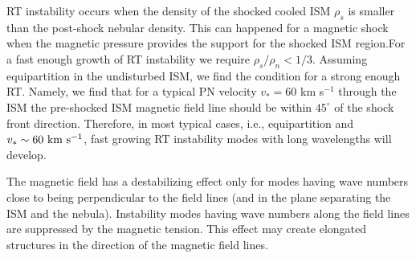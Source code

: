 \documentclass{article}
\def \s{\rm{s}}
\def \km{\rm{km}}
\def \s{~\rm{s}}
\def \km{~\rm{km}}
\begin{document}
RT instability occurs when the density of the shocked cooled ISM 
$\rho_s$ is smaller
than the post-shock nebular density. 
This can happened for a magnetic shock when the magnetic pressure
 provides the support for the shocked ISM region.For a fast enough growth of
RT instability we require $\rho_s/\rho_n < 1/3$.  
Assuming equipartition  in the 
undisturbed ISM, we find the condition for a strong enough RT.
Namely, we  find that for a typical PN velocity $v_\ast=60$  km s$^{-1}$
 through the ISM the pre-shocked ISM
magnetic field line should be within $45^\circ$ of the shock front direction.
 Therefore, in most typical cases, i.e., equipartition and
$v_\ast \sim 60 \km \s^{-1}$, fast growing RT instability modes with long
wavelengths will develop.

The magnetic field has a destabilizing effect only for modes
having wave numbers close to being perpendicular to the field lines
(and in the plane separating the ISM and the nebula).
Instability modes having wave numbers along the field lines are
suppressed by the magnetic tension. 
This effect may create elongated structures in the direction of the
magnetic field lines.
\end{document}
